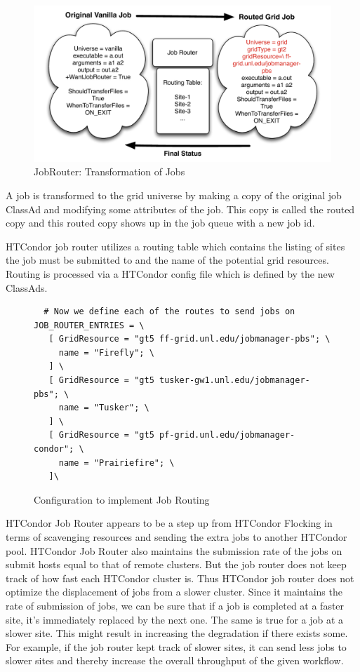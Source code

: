 \documentclass[ms,electronic,double]{nuthesis}
\begin{document}
\begin{figure}[htbp!]
\begin{center}
\includegraphics[scale=0.75]{images/jobRouter}
\caption{JobRouter: Transformation of Jobs}
\label{fig:JobRouter}
\end{center}
\end{figure}

A job is transformed to the grid universe by making a copy of the original job 
ClassAd and modifying some attributes of the job. This copy is called the routed 
copy and this routed copy shows up in the job queue with a new job id\cite{manual56}.

HTCondor job router utilizes a routing table which contains the listing of sites 
the job must be submitted to and the name of the potential grid resources. Routing is processed via a  HTCondor config file which is defined by the new ClassAds.

\begin{figure}
\begin{lstlisting}
  # Now we define each of the routes to send jobs on
JOB_ROUTER_ENTRIES = \
   [ GridResource = "gt5 ff-grid.unl.edu/jobmanager-pbs"; \
     name = "Firefly"; \
   ] \
   [ GridResource = "gt5 tusker-gw1.unl.edu/jobmanager-pbs"; \
     name = "Tusker"; \
   ] \
   [ GridResource = "gt5 pf-grid.unl.edu/jobmanager-condor"; \
     name = "Prairiefire"; \
   ]\

\end{lstlisting}
\caption{Configuration to implement Job Routing}
\end{figure}

HTCondor Job Router appears to be a step up from HTCondor Flocking in terms of 
scavenging resources and sending the extra jobs to another HTCondor pool. HTCondor 
Job Router also maintains the submission rate of the jobs on submit hosts equal to that of remote clusters. But the job 
router does not keep track of how fast each HTCondor cluster is. Thus 
HTCondor job router does not optimize the displacement of jobs from a slower 
cluster. Since it maintains the rate of submission of jobs, we can be sure that if a job is completed 
at a faster site, it's immediately replaced by the next one. The same is true for a job at a slower site.
This might result in increasing the degradation if there exists some. For example, if the job router kept track of slower sites, it
can send less jobs to slower sites and thereby increase the overall throughput of the given workflow.
\end{document}
